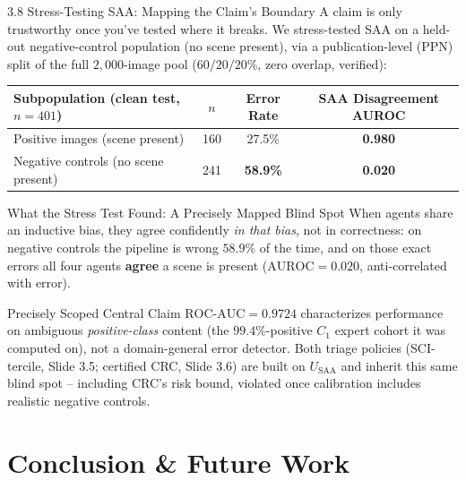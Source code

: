 \documentclass[aspectratio=169,11pt]{beamer}
\begin{document}
\begin{frame}{3.8 Stress-Testing SAA: Mapping the Claim's Boundary}
\scriptsize
A claim is only trustworthy once you've tested where it breaks. We stress-tested SAA on a held-out negative-control population (no scene present), via a publication-level (PPN) split of the full $2{,}000$-image pool ($60/20/20\%$, zero overlap, verified):

\begin{table}[!htbp]
\centering
\begin{tabular}{lccc}
\toprule
\textbf{Subpopulation (clean test, $n=401$)} & $n$ & \textbf{Error Rate} & \textbf{SAA Disagreement AUROC} \\
\midrule
Positive images (scene present) & 160 & 27.5\% & \textcolor{PrismGreen}{\textbf{0.980}} \\
Negative controls (no scene present) & 241 & \textbf{58.9\%} & \textcolor{HildesheimRed}{\textbf{0.020}} \\
\bottomrule
\end{tabular}
\end{table}

\begin{alertblock}{What the Stress Test Found: A Precisely Mapped Blind Spot}
When agents share an inductive bias, they agree confidently \emph{in that bias}, not in correctness: on negative controls the pipeline is wrong $58.9\%$ of the time, and on those exact errors all four agents \textbf{agree} a scene is present ($\text{AUROC}=0.020$, anti-correlated with error).
\end{alertblock}

\begin{block}{Precisely Scoped Central Claim}
$\text{ROC-AUC}=0.9724$ characterizes performance on ambiguous \emph{positive-class} content (the $99.4\%$-positive $C_1$ expert cohort it was computed on), not a domain-general error detector. Both triage policies (SCI-tercile, Slide 3.5; certified CRC, Slide 3.6) are built on $U_{\text{SAA}}$ and inherit this same blind spot -- including CRC's risk bound, violated once calibration includes realistic negative controls.
\end{block}
\end{frame}

\section{Conclusion \& Future Work}
\end{document}
